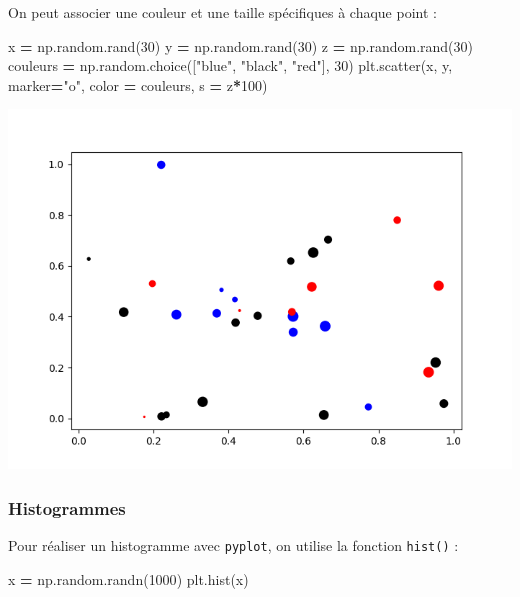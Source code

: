 \documentclass[
  12pt,
]{book}
\newenvironment{Shaded}{\begin{snugshade}}{\end{snugshade}}
\newcommand{\DecValTok}[1]{\textcolor[rgb]{0.00,0.00,0.81}{#1}}
\newcommand{\NormalTok}[1]{#1}
\newcommand{\OperatorTok}[1]{\textcolor[rgb]{0.81,0.36,0.00}{\textbf{#1}}}
\newcommand{\StringTok}[1]{\textcolor[rgb]{0.31,0.60,0.02}{#1}}
\numberwithin{equation}{section}
\numberwithin{countremarque}{section}
\begin{document}
On peut associer une couleur et une taille spécifiques à chaque point :

\begin{Shaded}
\begin{Highlighting}[]
\NormalTok{x }\OperatorTok{=}\NormalTok{ np.random.rand(}\DecValTok{30}\NormalTok{)}
\NormalTok{y }\OperatorTok{=}\NormalTok{ np.random.rand(}\DecValTok{30}\NormalTok{)}
\NormalTok{z }\OperatorTok{=}\NormalTok{ np.random.rand(}\DecValTok{30}\NormalTok{)}
\NormalTok{couleurs }\OperatorTok{=}\NormalTok{ np.random.choice([}\StringTok{"blue"}\NormalTok{, }\StringTok{"black"}\NormalTok{, }\StringTok{"red"}\NormalTok{], }\DecValTok{30}\NormalTok{)}
\NormalTok{plt.scatter(x, y, marker}\OperatorTok{=}\StringTok{"o"}\NormalTok{, color }\OperatorTok{=}\NormalTok{ couleurs, s }\OperatorTok{=}\NormalTok{ z}\OperatorTok{*}\DecValTok{100}\NormalTok{)}
\end{Highlighting}
\end{Shaded}

\begin{center}\includegraphics[width=9.03in]{figs/pyplot/scatter_bubble} \end{center}

\subsubsection{Histogrammes}\label{histogrammes}

Pour réaliser un histogramme avec \texttt{pyplot}, on utilise la fonction \texttt{hist()} :

\begin{Shaded}
\begin{Highlighting}[]
\NormalTok{x }\OperatorTok{=}\NormalTok{ np.random.randn(}\DecValTok{1000}\NormalTok{)}
\NormalTok{plt.hist(x)}
\end{Highlighting}
\end{Shaded}
\end{document}
